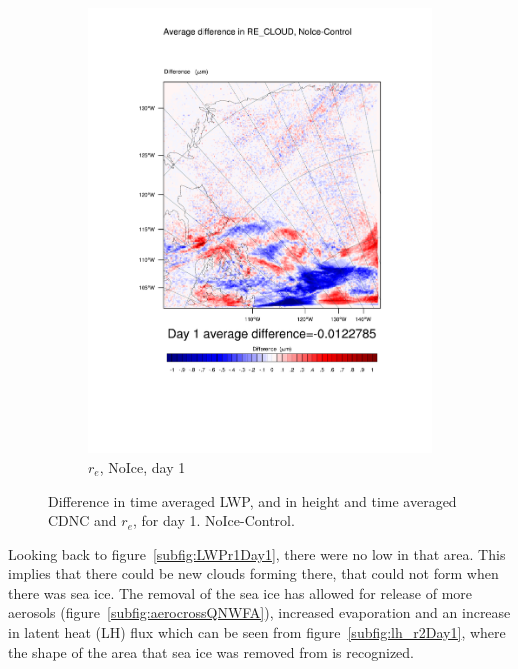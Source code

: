 \begin{figure}
	\begin{subfigure}{0.40\textwidth}
		\centering
		\includegraphics[width=\textwidth]{results/noice/diff_NoIce_RE_CLOUD_Day1.pdf}
		\caption{$r_e$, NoIce, day 1}
		\label{subfig:recloud_r2Day1}
	\end{subfigure}
\caption{Difference in time averaged LWP, and in height and time averaged CDNC and $r_e$, for day 1. NoIce-Control.}
\label{fig:lwpcdncre_r2Day1}
\end{figure}

Looking back to figure~\ref{subfig:LWPr1Day1}, there were no low in that area. This implies that there could be new clouds forming there, that could not form when there was sea ice. The removal of the sea ice has allowed for release of more aerosols (figure~\ref{subfig:aerocrossQNWFA}), increased evaporation and an increase in latent heat (LH) flux which can be seen from figure~\ref{subfig:lh_r2Day1}, where the shape of the area that sea ice was removed from is recognized. 

